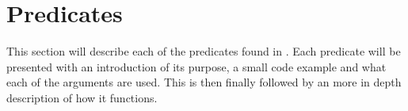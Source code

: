 \section{Predicates}
This section will describe each of the predicates found in \FW. Each predicate will be presented with an introduction of its purpose, a small code example and what each of the arguments are used. This is then finally followed by an more in depth description of how it functions.








